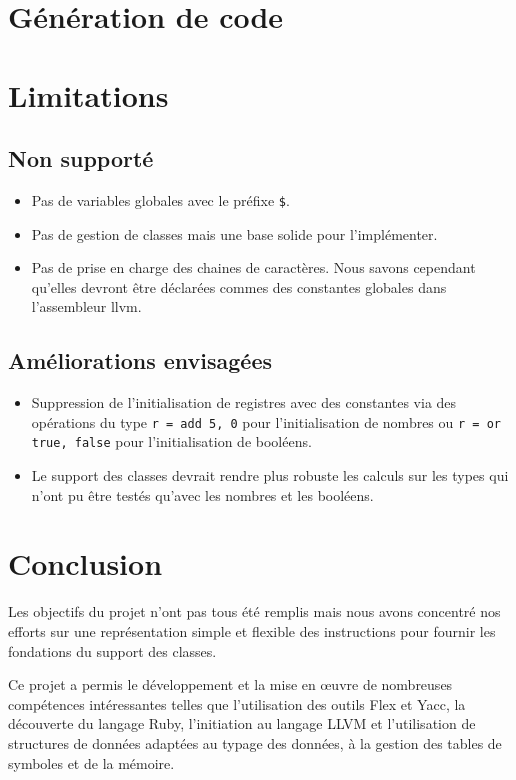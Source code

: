 \documentclass[12pt]{article}
\begin{document}
\section{Génération de code}

\section{Limitations}

\subsection{Non supporté}
\begin{itemize}
	\item Pas de variables globales avec le préfixe \verb!$!.
	\item Pas de gestion de classes mais une base solide pour l'implémenter.
	\item Pas de prise en charge des chaines de caractères. Nous savons cependant qu'elles devront être déclarées commes des constantes globales dans l'assembleur llvm.
\end{itemize}

\subsection{Améliorations envisagées}
\begin{itemize}
	\item Suppression de l'initialisation de registres avec des constantes via des opérations du type \verb!r = add 5, 0! pour l'initialisation de nombres ou \verb!r = or true, false! pour l'initialisation de booléens.
	\item Le support des classes devrait rendre plus robuste les calculs sur les types qui n'ont pu être testés qu'avec les nombres et les booléens.
\end{itemize}

\section{Conclusion}

Les objectifs du projet n'ont pas tous été remplis mais nous avons concentré nos efforts sur une représentation simple et flexible des instructions pour fournir les fondations du support des classes.

Ce projet a permis le développement et la mise en œuvre de nombreuses
compétences intéressantes telles que l'utilisation des outils Flex et Yacc, la
découverte du langage Ruby, l'initiation au langage LLVM et l'utilisation de
structures de données adaptées au typage des données, à la gestion des tables
de symboles et de la mémoire.
\end{document}
